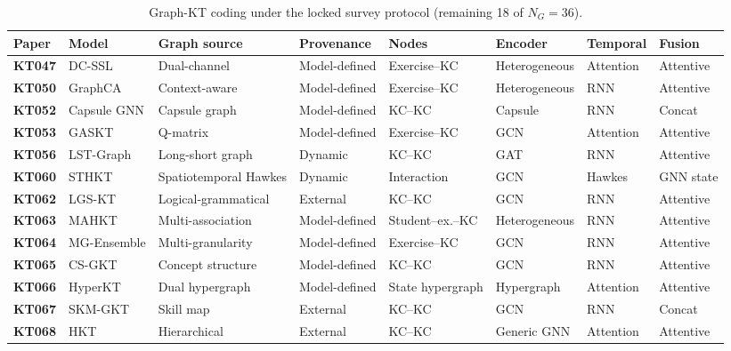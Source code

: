 \documentclass[lettersize,journal]{IEEEtran}
\begin{document}
\begin{table}[t]
\caption{Graph-KT coding under the locked survey protocol (remaining 18 of $N_G=36$).}
\label{tab:graph_taxonomy_b}
\centering
\footnotesize
\setlength{\tabcolsep}{3.5pt}
\begin{tabular}{@{}ll>{\raggedright\arraybackslash}p{2.15cm}l>{\raggedright\arraybackslash}p{1.55cm}lll@{}}
\toprule
\textbf{Paper} & \textbf{Model} & \textbf{Graph source} & \textbf{Provenance} & \textbf{Nodes} & \textbf{Encoder} & \textbf{Temporal} & \textbf{Fusion} \\
\midrule
\textbf{KT047} & DC-SSL \cite{KT047_DCSSL_2023} & Dual-channel & Model-defined & Exercise--KC & Heterogeneous & Attention & Attentive \\
\textbf{KT050} & GraphCA \cite{KT050_GraphCA_2023} & Context-aware & Model-defined & Exercise--KC & Heterogeneous & RNN & Attentive \\
\textbf{KT052} & Capsule GNN \cite{KT052_CapsuleGNN_2022} & Capsule graph & Model-defined & KC--KC & Capsule & RNN & Concat \\
\textbf{KT053} & GASKT \cite{KT053_GASKT_2021} & Q-matrix & Model-defined & Exercise--KC & GCN & Attention & Attentive \\
\textbf{KT056} & LST-Graph \cite{KT056_LSTGraph_2025} & Long-short graph & Dynamic & KC--KC & GAT & RNN & Attentive \\
\textbf{KT060} & STHKT \cite{KT060_STHKT_2025} & Spatiotemporal Hawkes & Dynamic & Interaction & GCN & Hawkes & GNN state \\
\textbf{KT062} & LGS-KT \cite{KT062_LGSKT_2025} & Logical-grammatical & External & KC--KC & GCN & RNN & Attentive \\
\textbf{KT063} & MAHKT \cite{KT063_MAHKT_2025} & Multi-association & Model-defined & Student--ex.--KC & Heterogeneous & RNN & Attentive \\
\textbf{KT064} & MG-Ensemble \cite{KT064_MGEnsemble_2025} & Multi-granularity & Model-defined & Exercise--KC & GCN & RNN & Attentive \\
\textbf{KT065} & CS-GKT \cite{KT065_CSGKT_2025} & Concept structure & Model-defined & KC--KC & GCN & RNN & Attentive \\
\textbf{KT066} & HyperKT \cite{KT066_HyperKT_2025} & Dual hypergraph & Model-defined & State hypergraph & Hypergraph & Attention & Attentive \\
\textbf{KT067} & SKM-GKT \cite{KT067_SKMGKT_2025} & Skill map & External & KC--KC & GCN & RNN & Concat \\
\textbf{KT068} & HKT \cite{KT068_HKT_2025} & Hierarchical & External & KC--KC & Generic GNN & Attention & Attentive \\

\end{tabular}
\end{table}
\end{document}
